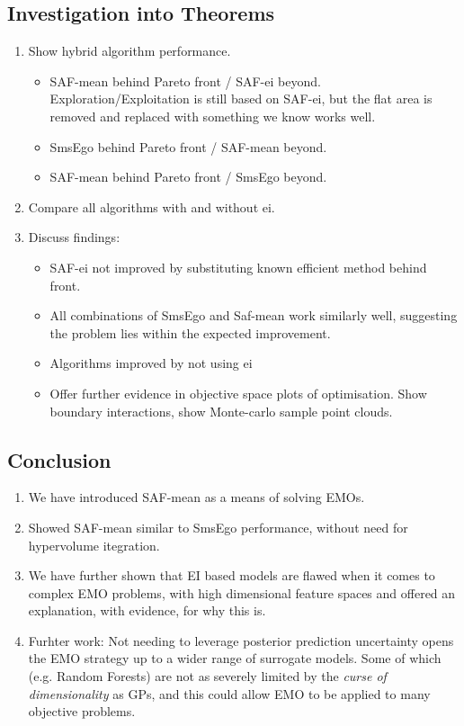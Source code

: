 \documentclass[runningheads]{llncs}
\begin{document}
\subsection{Investigation into Theorems}
\begin{enumerate}
    \item Show hybrid algorithm performance.
    \begin{itemize}
        \item SAF-mean behind Pareto front / SAF-ei beyond. Exploration/Exploitation is still based on SAF-ei, but the flat area is removed and replaced with something we know works well.
        \item SmsEgo behind Pareto front / SAF-mean beyond. 
        \item SAF-mean behind Pareto front / SmsEgo beyond. 
    \end{itemize}
    \item Compare all algorithms with and without ei. 
    \item Discuss findings:
        \begin{itemize}
            \item SAF-ei not improved by substituting known efficient method behind front.
            \item All combinations of SmsEgo and Saf-mean work similarly well, suggesting the problem lies within the expected improvement. 
            \item Algorithms improved by not using ei
            \item Offer further evidence in objective space plots of optimisation. Show boundary interactions, show Monte-carlo sample point clouds. 
        \end{itemize}
\end{enumerate}

\subsection{Conclusion}
\begin{enumerate}
    \item We have introduced SAF-mean as a means of solving EMOs.
    \item Showed SAF-mean similar to SmsEgo performance, without need for hypervolume itegration.
    \item We have further shown that EI based models are flawed when it comes to complex EMO problems, with high dimensional feature spaces and offered an explanation, with evidence, for why this is. 
    \item Furhter work: Not needing to leverage posterior prediction uncertainty opens the EMO strategy up to a wider range of surrogate models. Some of which (e.g. Random Forests) are not as severely limited by the \textit{curse of dimensionality} as GPs, and this could allow EMO to be applied to many objective problems. 
\end{enumerate}


\clearpage


\end{document}

